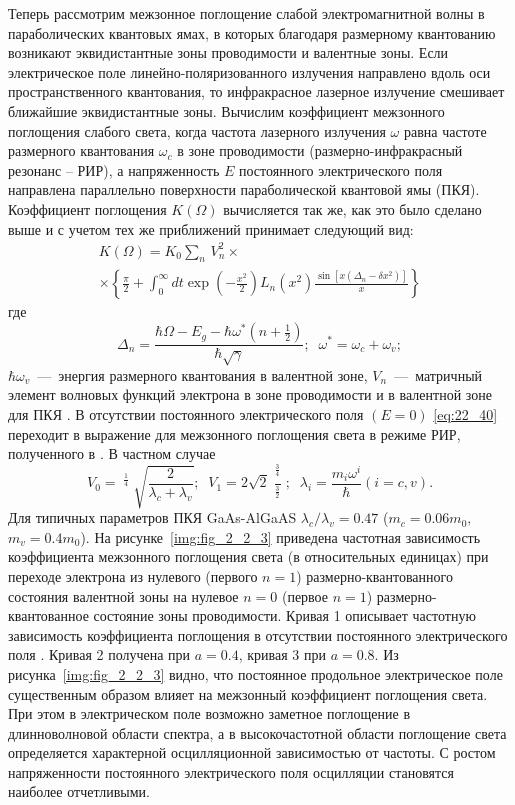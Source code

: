 Теперь рассмотрим межзонное поглощение слабой электромагнитной волны в параболических квантовых ямах, в которых благодаря размерному квантованию возникают эквидистантные зоны проводимости и валентные зоны. Если электрическое поле линейно-поляризованного излучения направлено вдоль оси пространственного квантования, то инфракрасное лазерное излучение смешивает ближайшие эквидистантные зоны. Вычислим коэффициент межзонного поглощения слабого света, когда частота лазерного излучения $\omega $ равна частоте размерного квантования $\omega _{c} $ в зоне проводимости (размерно-инфракрасный резонанс -- РИР), а напряженность $E$ постоянного электрического поля направлена параллельно поверхности параболической квантовой ямы (ПКЯ). Коэффициент поглощения $K(\Omega )$ вычисляется так же, как это было сделано выше и с учетом тех же приближений принимает следующий вид: 
\begin{multline} \label{eq:22_40} 
K(\Omega )=K_{0} \sum _{n} \, V_{n}^{2} \times  \\
\times \left\{\frac{\pi }{2} +\int _{0}^{\infty } dt \exp \left(-\frac{x^{2} }{2} \right)L_{n} \left(x^{2} \right)\frac{\sin \left[x\left(\Delta _{n} -\delta x^{2} \right)\right]}{x} \right\}
\end{multline} 
где 
\[\Delta _{n} =\frac{\hbar \Omega -E_{g} -\hbar \omega ^{*} \left(n+{\tfrac{1}{2}} \right)}{\hbar \sqrt{\gamma } } ;\; \; \omega ^{*} =\omega _{c} +\omega _{v} ;\] 
$\hbar \omega _{v} $~---~энергия размерного квантования в валентной зоне, $V_{n} $~---~матричный элемент волновых функций электрона в зоне проводимости и в валентной зоне для ПКЯ \cite{Sinyavskii2002}. В отсутствии постоянного электрического поля $(E=0)$ \eqref{eq:22_40} переходит в выражение для межзонного поглощения света в режиме РИР, полученного в \cite{Sinyavskii2002}. В частном случае 
\[V_{0} =\mathop{\left(\lambda _{c} \lambda _{v} \right)}\nolimits^{{\tfrac{1}{4}} } \sqrt{\frac{2}{\lambda _{c} +\lambda _{v} } } ;\; \; V_{1} =2\sqrt{2} \frac{\mathop{\left(\lambda _{c} \lambda _{v} \right)}\nolimits^{{\tfrac{3}{4}} } }{\mathop{\left(\lambda _{c} +\lambda _{v} \right)}\nolimits^{{\tfrac{3}{2}} } } ;\; \; \lambda _{i} =\frac{m_{i} \omega ^{i} }{\hbar } (i=c,v).\] 
Для типичных параметров ПКЯ GaAs-AlGaAS $\lambda _{c} /\lambda _{v} =0.47$ ($m_{c} =0.06m_{0} ,$ $m_{v} =0.4m_{0} $). На рисунке~\ref{img:fig_2_2_3} приведена частотная зависимость коэффициента межзонного поглощения света (в относительных единицах) при переходе электрона из нулевого (первого $n=1$) размерно-квантованного состояния валентной зоны на нулевое $n=0$ (первое $n=1$) размерно-квантованное состояние зоны проводимости. Кривая 1 описывает частотную зависимость коэффициента поглощения в отсутствии постоянного электрического поля \cite{Sinyavskii2002}. Кривая 2 получена при $a=0.4$, кривая 3 при $a=0.8$. Из рисунка~\ref{img:fig_2_2_3} видно, что постоянное продольное электрическое поле существенным образом влияет на межзонный коэффициент поглощения света. При этом в электрическом поле возможно заметное поглощение в длинноволновой области спектра, а в высокочастотной области поглощение света определяется характерной осцилляционной зависимостью от частоты. С ростом напряженности постоянного электрического поля осцилляции становятся наиболее отчетливыми. 
